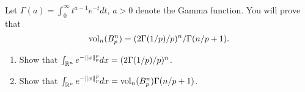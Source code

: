

\newif\ifsolutions\solutionsfalse



\ifsolutions
\exercisesol{1}
\else
{}
\fi

\begin{exercise}~\\
Let $\Gamma(a) = \int_0^\infty t^{a-1} e^{-t} dt$, $a > 0$ denote the Gamma function.
You will prove that
\[
{\rm vol}_n(B_p^n) = (2\Gamma(1/p)/p)^n/\Gamma(n/p+1).
\]
\begin{enumerate}
\item Show that $\int_{\mathbb{R}^n} e^{-\|x\|_p^p} dx = (2\Gamma(1/p)/p)^n$. \\
\item Show that $\int_{\mathbb{R}^n} e^{-\|x\|_p^p} dx = {\rm vol}_n(B_p^n) \Gamma(n/p+1)$.
\\
\end{enumerate}
\end{exercise}

